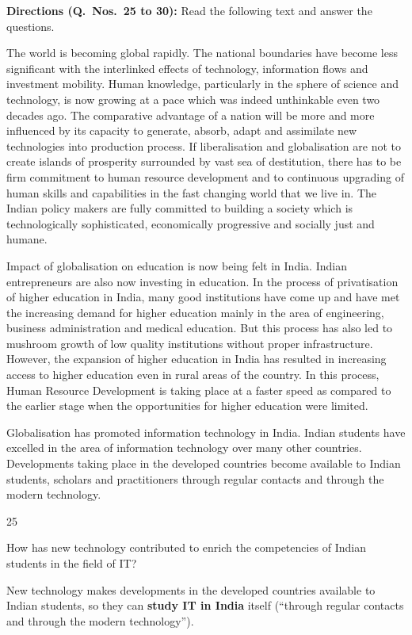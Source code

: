 \begin{context}
\textbf{Directions (Q.~Nos.~25 to 30):} Read the following text and answer the questions.\par\smallskip
The world is becoming global rapidly. The national boundaries have become less significant with the interlinked effects of technology, information flows and investment mobility. Human knowledge, particularly in the sphere of science and technology, is now growing at a pace which was indeed unthinkable even two decades ago. The comparative advantage of a nation will be more and more influenced by its capacity to generate, absorb, adapt and assimilate new technologies into production process. If liberalisation and globalisation are not to create islands of prosperity surrounded by vast sea of destitution, there has to be firm commitment to human resource development and to continuous upgrading of human skills and capabilities in the fast changing world that we live in. The Indian policy makers are fully committed to building a society which is technologically sophisticated, economically progressive and socially just and humane.

Impact of globalisation on education is now being felt in India. Indian entrepreneurs are also now investing in education. In the process of privatisation of higher education in India, many good institutions have come up and have met the increasing demand for higher education mainly in the area of engineering, business administration and medical education. But this process has also led to mushroom growth of low quality institutions without proper infrastructure. However, the expansion of higher education in India has resulted in increasing access to higher education even in rural areas of the country. In this process, Human Resource Development is taking place at a faster speed as compared to the earlier stage when the opportunities for higher education were limited.

Globalisation has promoted information technology in India. Indian students have excelled in the area of information technology over many other countries. Developments taking place in the developed countries become available to Indian students, scholars and practitioners through regular contacts and through the modern technology.
\end{context}
\begin{question}{25}
{How has new technology contributed to enrich the competencies of Indian students in the field of IT?\par}
\begin{explain}
New technology makes developments in the developed countries available to Indian students, so they can \textbf{study IT in India} itself (``through regular contacts and through the modern technology'').
\end{explain}
\end{question}


